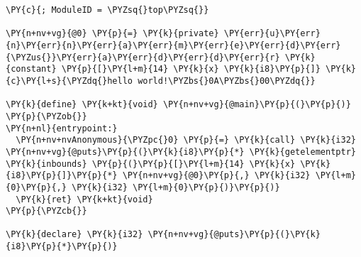 \begin{Verbatim}[commandchars=\\\{\}]
\PY{c}{; ModuleID = \PYZsq{}top\PYZsq{}}

\PY{n+nv+vg}{@0} \PY{p}{=} \PY{k}{private} \PY{err}{u}\PY{err}{n}\PY{err}{n}\PY{err}{a}\PY{err}{m}\PY{err}{e}\PY{err}{d}\PY{err}{\PYZus{}}\PY{err}{a}\PY{err}{d}\PY{err}{d}\PY{err}{r} \PY{k}{constant} \PY{p}{[}\PY{l+m}{14} \PY{k}{x} \PY{k}{i8}\PY{p}{]} \PY{k}{c}\PY{l+s}{\PYZdq{}hello world!\PYZbs{}0A\PYZbs{}00\PYZdq{}}

\PY{k}{define} \PY{k+kt}{void} \PY{n+nv+vg}{@main}\PY{p}{(}\PY{p}{)} \PY{p}{\PYZob{}}
\PY{n+nl}{entrypoint:}
  \PY{n+nv+nvAnonymous}{\PYZpc{}0} \PY{p}{=} \PY{k}{call} \PY{k}{i32} \PY{n+nv+vg}{@puts}\PY{p}{(}\PY{k}{i8}\PY{p}{*} \PY{k}{getelementptr} \PY{k}{inbounds} \PY{p}{(}\PY{p}{[}\PY{l+m}{14} \PY{k}{x} \PY{k}{i8}\PY{p}{]}\PY{p}{*} \PY{n+nv+vg}{@0}\PY{p}{,} \PY{k}{i32} \PY{l+m}{0}\PY{p}{,} \PY{k}{i32} \PY{l+m}{0}\PY{p}{)}\PY{p}{)}
  \PY{k}{ret} \PY{k+kt}{void}
\PY{p}{\PYZcb{}}

\PY{k}{declare} \PY{k}{i32} \PY{n+nv+vg}{@puts}\PY{p}{(}\PY{k}{i8}\PY{p}{*}\PY{p}{)}
\end{Verbatim}
